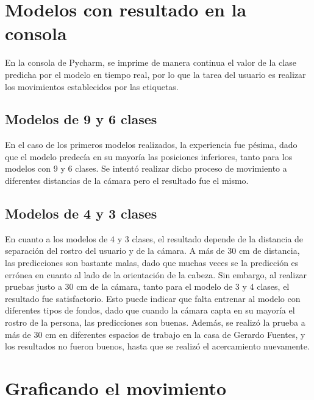 \section{Modelos con resultado en la consola}
En la consola de Pycharm, se imprime de manera continua el valor de la clase predicha por el modelo en tiempo real, por lo que la tarea del usuario es realizar los movimientos establecidos por las etiquetas. 
\subsection{Modelos de 9 y 6 clases}
En el caso de los primeros modelos realizados, la experiencia fue pésima, dado que el modelo predecía en su mayoría las posiciones inferiores, tanto para los modelos con 9 y 6 clases. Se intentó realizar dicho proceso de movimiento a diferentes distancias de la cámara pero el resultado fue el mismo.
\subsection{Modelos de 4 y 3 clases}
En cuanto a los modelos de 4 y 3 clases, el resultado depende de la distancia de separación del rostro del usuario y de la cámara. A más de 30 cm de distancia, las predicciones son bastante malas, dado que muchas veces se la predicción es errónea en cuanto al lado de la orientación de la cabeza. Sin embargo, al realizar pruebas justo a 30 cm de la cámara, tanto para el modelo de 3 y 4 clases, el resultado fue satisfactorio. Esto puede indicar que falta entrenar al modelo con diferentes tipos de fondos, dado que cuando la cámara capta en su mayoría el rostro de la persona, las predicciones son buenas. Además, se realizó la prueba a más de 30 cm en diferentes espacios de trabajo en la casa de Gerardo Fuentes, y los resultados no fueron buenos, hasta que se realizó el acercamiento nuevamente. 

\section{Graficando el movimiento}